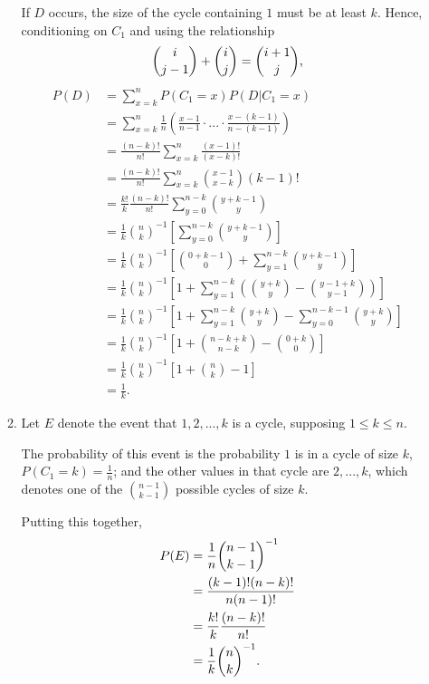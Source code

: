 \documentclass{article}
\begin{document}
\begin{enumerate}
\begin{enumerate}
        If $D$ occurs, the size of the cycle containing $1$ must be at least $k$.
        Hence, conditioning on $C_1$ and using the relationship
        \[ {i \choose j-1} + {i \choose j} = {i+1 \choose j} \text, \]
        \[\begin{split}
        P(D)    & = \sum_{x=k}^n P(C_1=x) P(D|C_1=x) \\
                & = \sum_{x=k}^n \frac{1}{n} \left( \frac{x-1}{n-1}\cdot...\cdot\frac{x-(k-1)}{n-(k-1)} \right) \\
                & = \frac{(n-k)!}{n!} \sum_{x=k}^n \frac{(x-1)!}{(x-k)!} \\
                & = \frac{(n-k)!}{n!} \sum_{x=k}^n {x-1 \choose x-k}(k-1)! \\
                & = \frac{k!}{k} \frac{(n-k)!}{n!} \sum_{y=0}^{n-k} {y+k-1 \choose y} \\
                & = \frac{1}{k} {n \choose k}^{-1} \left[ \sum_{y=0}^{n-k} {y+k-1 \choose y} \right] \\
                & = \frac{1}{k} {n \choose k}^{-1} \left[ {0+k-1 \choose 0} + \sum_{y=1}^{n-k} {y+k-1 \choose y} \right] \\
                & = \frac{1}{k} {n \choose k}^{-1} \left[ 1 + \sum_{y=1}^{n-k} \left( {y+k \choose y} - {y-1+k \choose y-1} \right) \right] \\
                & = \frac{1}{k} {n \choose k}^{-1} \left[ 1 + \sum_{y=1}^{n-k} {y+k \choose y} - \sum_{y=0}^{n-k-1}{y+k \choose y} \right] \\
                & = \frac{1}{k} {n \choose k}^{-1} \left[ 1 + {n-k+k \choose n-k} - {0+k \choose 0} \right] \\
                & = \frac{1}{k} {n \choose k}^{-1} \left[ 1 + {n \choose k} - 1 \right] \\
                & = \frac{1}{k}.
        \end{split}\]
    \item
        Let $E$ denote the event that $1,2,...,k$ is a cycle, supposing $1 \leq k \leq n$.

        The probability of this event is the probability $1$ is in a cycle of size $k$, $P(C_1=k)=\frac{1}{n}$;
        and the other values in that cycle are $2,...,k$, which denotes one of the ${n-1 \choose k-1}$ possible cycles of size $k$.

        Putting this together,
        \[\begin{split}
        P(E)    & = \frac{1}{n}{n-1 \choose k-1}^{-1} \\
                & = \frac{(k-1)!(n-k)!}{n(n-1)!} \\
                & = \frac{k!}{k} \frac{(n-k)!}{n!} \\
                & = \frac{1}{k}{n \choose k}^{-1} \text.\\
        \end{split}\]
    \end{enumerate}
\end{enumerate}
\end{document}
